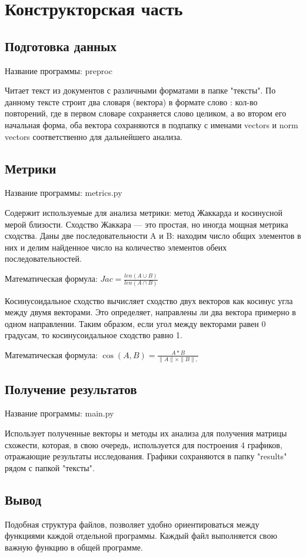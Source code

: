 \chapter{Конструкторская часть}

\section{Подготовка данных}
Название программы: preproc

Читает текст из документов с различными форматами в папке "тексты". По данному тексте строит два словаря (вектора) 
в формате {слово : кол-во повторений}, где в первом словаре сохраняется слово целиком, а во втором его начальная форма, 
оба вектора сохраняются в подпапку с именами vectors и norm vectors соответственно для дальнейшего анализа.

\section{Метрики}

Название программы: metrics.py

Содержит используемые для анализа метрики: метод Жаккарда и косинусной мерой близости.
Сходство Жаккара — это простая, но иногда мощная метрика сходства. Даны две последовательности A и B: 
находим число общих элементов в них и делим найденное число на количество элементов обеих последовательностей.

Математическая формула: 
\begin{math}
    \label{jac_sim}
    Jac = \frac{len(A \cup B)}{len(A \cap B)}
\end{math}

Косинусоидальное сходство вычисляет сходство двух векторов как косинус угла между двумя векторами. Это определяет,
направлены ли два вектора примерно в одном направлении. Таким образом, если угол между векторами равен 0 градусам, то косинусоидальное сходство равно 1.

Математическая формула: 
\begin{math}
    \label{cos_sim}
    \cos(A, B) = \frac{A * B}{\| A \| \times \| B \|,}
\end{math}

\section{Получение результатов}

Название программы: main.py

Использует полученные векторы и методы их анализа для получения матрицы схожести, которая, в свою очередь, 
используется для построения 4 графиков, отражающие результаты исследования. Графики сохраняются в папку "results" рядом с папкой "тексты".

\section*{Вывод}

Подобная структура файлов, позволяет удобно ориентироваться между функциями каждой отдельной программы. Каждый файл выполняется свою важную функцию в общей программе.

\clearpage
